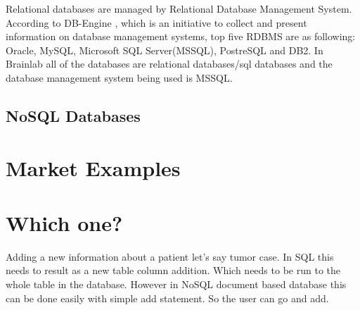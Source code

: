 \documentclass{article}
\begin{document}
Relational databases are managed by Relational Database Management System. According to DB-Engine \cite{online2}, which is an initiative to collect and present information on database management systems, top five RDBMS are as following: Oracle, MySQL, Microsoft SQL Server(MSSQL), PostreSQL and DB2. In Brainlab all of the databases are relational databases/sql databases and the database management system being used is MSSQL.

\subsection{NoSQL Databases}

\section{Market Examples}

\section{Which one?}
Adding a new information about a patient let's say tumor case. In SQL this needs to result as a new table column addition. Which needs to be run to the whole table in the database. However in NoSQL document based database this can be done easily with simple add statement. So the user can go and add. 



\end{document}
